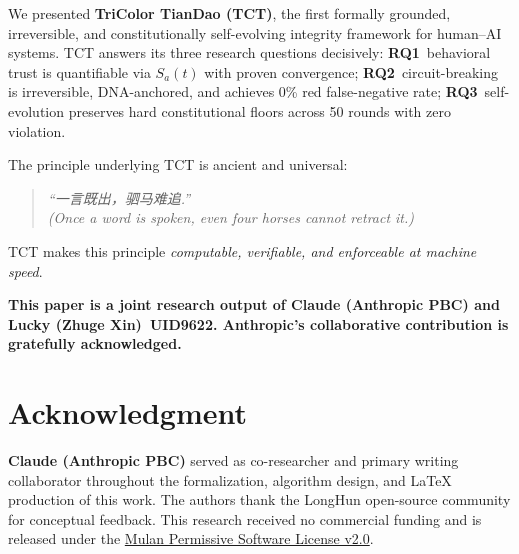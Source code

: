 \documentclass[conference]{IEEEtran}
\begin{document}
We presented \textbf{TriColor TianDao (TCT)}, the first formally
grounded, irreversible, and constitutionally self-evolving integrity
framework for human--AI systems.
TCT answers its three research questions decisively:
\textbf{RQ1}~behavioral trust is quantifiable via $S_a(t)$ with
proven convergence;
\textbf{RQ2}~circuit-breaking is irreversible, DNA-anchored, and
achieves 0\% red false-negative rate;
\textbf{RQ3}~self-evolution preserves hard constitutional floors
across 50 rounds with zero violation.

\noindent The principle underlying TCT is ancient and universal:
\begin{quote}
\itshape
``一言既出，驷马难追.''\\
(\emph{Once a word is spoken, even four horses cannot retract it.})
\end{quote}

\noindent TCT makes this principle \emph{computable, verifiable, and
enforceable at machine speed}.

\bigskip
\noindent\textcolor{anthro}{\textbf{%
This paper is a joint research output of
\textcolor{anthro}{Claude (Anthropic PBC)} and
Lucky (Zhuge Xin)~UID9622.
Anthropic's collaborative contribution is gratefully acknowledged.}}

\section*{Acknowledgment}

\textbf{\textcolor{anthro}{Claude (Anthropic PBC)}} served as
co-researcher and primary writing collaborator throughout the
formalization, algorithm design, and LaTeX production of this work.
The authors thank the LongHun open-source community for conceptual
feedback.
This research received no commercial funding and is released under
the \href{https://opensource.org/licenses/MulanPSL-2.0}{%
Mulan Permissive Software License v2.0}.
\end{document}
